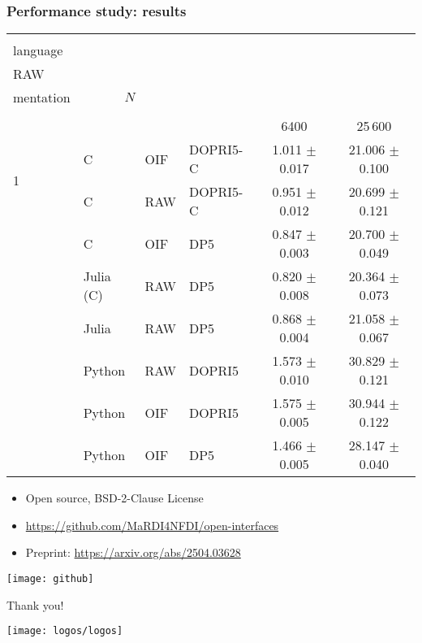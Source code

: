 \documentclass[10pt, aspectratio=169, progressbar=frametitle]{beamer}
\newcommand{\headerWithBreaks}[2]{{%
\multirow{2}{*}{%
  \begin{minipage}[t]{#1}{#2}\end{minipage}
}
}}
\begin{document}
\begin{frame}
  \frametitle{Performance study: results}

\newcommand{\myheader}{%
\headerWithBreaks{0.2em}{\#} &
\headerWithBreaks{3em}{User\\language} &
\headerWithBreaks{1.5em}{OIF/\\RAW} &
\headerWithBreaks{3em}{Imple-\\mentation} &
                                \multicolumn{2}{c}{$N$} \\
                                \cmidrule(lr){5-6}
}
  \vspace{1em}
  \centering
  \begin{tabular}{l l l l c c}
    \toprule
    \myheader                                                                                    \\
                       &           &     &          & 6400                & 25\,600              \\
    \midrule
    \multirow{2}{*}{1} & C         & OIF & DOPRI5-C & 1.011 \(\pm\) 0.017 & 21.006 \(\pm\) 0.100 \\
                       & C         & RAW & DOPRI5-C & 0.951 \(\pm\) 0.012 & 20.699 \(\pm\) 0.121 \\
    \addlinespace
    \addlinespace
    \multirow{3}{*}{2} & C         & OIF & DP5      & 0.847 \(\pm\) 0.003 & 20.700 \(\pm\) 0.049 \\
                       & Julia (C) & RAW & DP5      & 0.820 \(\pm\) 0.008 & 20.364 \(\pm\) 0.073 \\
                       & Julia     & RAW & DP5      & 0.868 \(\pm\) 0.004 & 21.058 \(\pm\) 0.067 \\
    \addlinespace
    \addlinespace
    \multirow{3}{*}{3} & Python    & RAW & DOPRI5   & 1.573 \(\pm\) 0.010 & 30.829 \(\pm\) 0.121 \\
                       & Python    & OIF & DOPRI5   & 1.575 \(\pm\) 0.005 & 30.944 \(\pm\) 0.122 \\
                       & Python    & OIF & DP5      & 1.466 \(\pm\) 0.005 & 28.147 \(\pm\) 0.040 \\
    \bottomrule
  \end{tabular}
\end{frame}

% 

\begin{frame}
  \begin{minipage}{0.618\textwidth}
    \begin{itemize}
      \item Open source, BSD-2-Clause License
      \item \url{https://github.com/MaRDI4NFDI/open-interfaces}
      \item Preprint: \url{https://arxiv.org/abs/2504.03628}
    \end{itemize}
  \end{minipage}%
  \begin{minipage}{0.382\textwidth}
    \texttt{[image: github]}
  \end{minipage}
\end{frame}

\begin{frame}
  \centering
  \vspace{9em}
  \huge{Thank you!}

  \vspace{3em}
  \texttt{[image: logos/logos]}
\end{frame}
\end{document}
